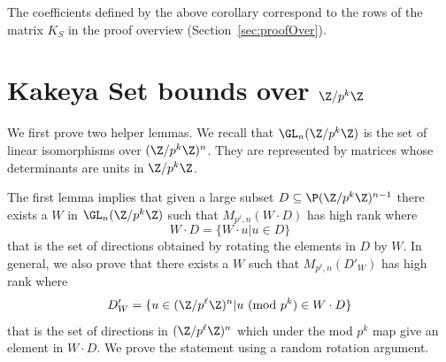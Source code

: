The coefficients defined by the above corollary correspond to the rows of the matrix $K_S$ in the proof overview (Section~\ref{sec:proofOver}).


\section{Kakeya Set bounds over $\Z/p^k\Z$}\label{sec:pkBd}

We first prove two helper lemmas. We recall that $\GL_n(\Z/p^k\Z)$ is the set of linear isomorphisms over $(\Z/p^k\Z)^n$. They are represented by matrices whose determinants are units in $\Z/p^k\Z$.

The first lemma implies that given a large subset $D\subseteq \P (\Z/p^k\Z)^{n-1}$ there exists a $W$ in $\GL_n(\Z/p^k\Z)$ such that $M_{p^\ell,n}(W\cdot D)$ has high rank where $$W \cdot D=\{W\cdot u|u\in D\}$$ 
that is the set of directions obtained by rotating the elements in $D$ by $W$. In general, we also prove that there exists a $W$ such that $M_{p^\ell,n}(D'_W)$ has high rank where 
$$D'_W=\{u\in (\Z/p^\ell\Z)^{n}| u\text{ (mod }p^k\text{)}\in W \cdot D\}$$ 
that is the set of directions in  $(\Z/p^\ell\Z)^{n}$ which under the mod $p^k$ map give an element in $W\cdot D$. We prove the statement using a random rotation argument.


